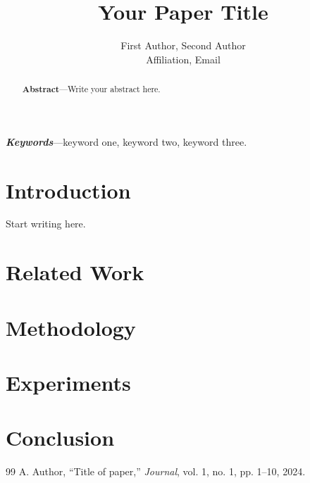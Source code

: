 \documentclass[10pt,twocolumn]{article}
\title{\textbf{Your Paper Title}}
\author{First Author, Second Author\\ \small Affiliation, Email}
\date{}
\begin{document}
\maketitle

\begin{abstract}
\textbf{Abstract}---Write your abstract here.
\end{abstract}

\textbf{\textit{Keywords}}---keyword one, keyword two, keyword three.

\section{Introduction}
Start writing here.

\section{Related Work}

\section{Methodology}

\section{Experiments}

\section{Conclusion}

\begin{thebibliography}{99}
 A. Author, ``Title of paper,'' \textit{Journal}, vol. 1, no. 1, pp. 1--10, 2024.
\end{thebibliography}
\end{document}
